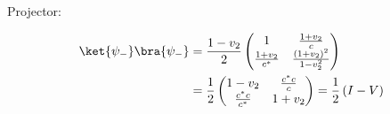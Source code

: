 \par Projector:

\begin{align}
\ket{\psi_-} \bra{\psi_-} &= \frac{1 - v_2}{2} \begin{pmatrix} 1 & \frac{1 +
v_2}{c} \\ \frac{1 + v_2}{c^*} & \frac{\left( 1 + v_2 \right)^2}{1 - v_2^2}
\end{pmatrix} \\
&= \frac{1}{2} \begin{pmatrix} 1 - v_2 & \frac{c^* c}{c} \\ \frac{c^* c }{c^*} &
1 + v_2 \end{pmatrix} = \frac{1}{2} \left( I - V \right)
\end{align}
